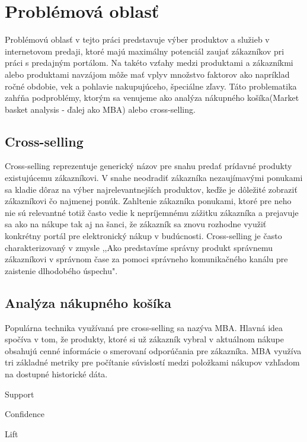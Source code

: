 \newpage


\chapter{Problémová oblasť}
\label{analyza_problemova_oblast}

Problémovú oblasť v tejto práci predstavuje výber produktov a služieb v internetovom predaji, ktoré majú maximálny potenciál zaujať zákazníkov pri práci s predajným portálom. Na takéto vzťahy medzi produktami a zákazníkmi alebo produktami navzájom môže mať vplyv množstvo faktorov ako napríklad ročné obdobie, vek a pohlavie nakupujúceho, špeciálne zľavy.
Táto problematika zahŕňa podproblémy, ktorým sa venujeme ako analýza nákupného košíka(Market basket analysis - ďalej ako MBA) alebo cross-selling.
 \newline
 
\section{Cross-selling}
\label{cross_selling}
Cross-selling reprezentuje generický názov pre snahu predať prídavné produkty existujúcemu zákazníkovi. V snahe neodradiť zákazníka nezaujímavými ponukami sa kladie dôraz na výber najrelevantnejších produktov, keďže je dôležité zobraziť zákazníkovi čo najmenej ponúk. Zahltenie zákazníka ponukami, ktoré pre neho nie sú relevantné totiž často vedie k nepríjemnému zážitku zákazníka a prejavuje sa ako na nákupe tak aj na šanci, že zákazník sa znovu rozhodne využiť konkrétny portál pre elektronický nákup v budúcnosti. Cross-selling je často charakterizovaný v zmysle ,,Ako predstavíme správny produkt správnemu zákazníkovi v správnom čase za pomoci správneho komunikačného kanálu pre zaistenie dlhodobého úspechu".

\section{Analýza nákupného košíka}
\label{market_basket_analysis}

Populárna technika využívaná pre cross-selling sa nazýva MBA. Hlavná idea spočíva v tom, že produkty, ktoré si už zákazník vybral v aktuálnom nákupe obsahujú cenné informácie o smerovaní odporúčania pre zákazníka. MBA využíva tri základné metriky pre počítanie súvislostí medzi položkami nákupov vzhľadom na dostupné historické dáta. 

\begin{my_itemize}
	\item {Support}
	\item {Confidence}
	\item {Lift}
\end{my_itemize}

